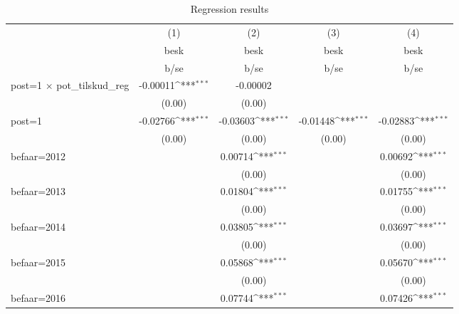 \begin{table}[htbp]\centering
\def\sym#1{\ifmmode^{#1}\else\(^{#1}\)\fi}
\caption{Regression results}
\begin{tabular}{l*{4}{c}}
\hline\hline
                    &\multicolumn{1}{c}{(1)}&\multicolumn{1}{c}{(2)}&\multicolumn{1}{c}{(3)}&\multicolumn{1}{c}{(4)}\\
                    &\multicolumn{1}{c}{besk}&\multicolumn{1}{c}{besk}&\multicolumn{1}{c}{besk}&\multicolumn{1}{c}{besk}\\
                    &        b/se         &        b/se         &        b/se         &        b/se         \\
\hline
post=1 $\times$ pot\_tilskud\_reg&    -0.00011\sym{***}&    -0.00002         &                     &                     \\
                    &      (0.00)         &      (0.00)         &                     &                     \\
post=1              &    -0.02766\sym{***}&    -0.03603\sym{***}&    -0.01448\sym{***}&    -0.02883\sym{***}\\
                    &      (0.00)         &      (0.00)         &      (0.00)         &      (0.00)         \\
befaar=2012         &                     &     0.00714\sym{***}&                     &     0.00692\sym{***}\\
                    &                     &      (0.00)         &                     &      (0.00)         \\
befaar=2013         &                     &     0.01804\sym{***}&                     &     0.01755\sym{***}\\
                    &                     &      (0.00)         &                     &      (0.00)         \\
befaar=2014         &                     &     0.03805\sym{***}&                     &     0.03697\sym{***}\\
                    &                     &      (0.00)         &                     &      (0.00)         \\
befaar=2015         &                     &     0.05868\sym{***}&                     &     0.05670\sym{***}\\
                    &                     &      (0.00)         &                     &      (0.00)         \\
befaar=2016         &                     &     0.07744\sym{***}&                     &     0.07426\sym{***}\\

\end{tabular}
\end{table}
